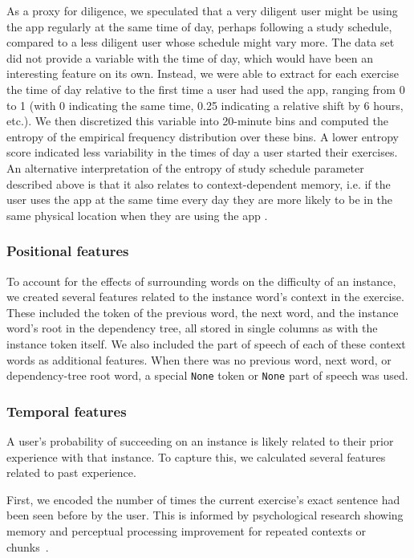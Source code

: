 \documentclass[11pt,a4paper]{article}
\begin{document}
As a proxy for diligence, we speculated that a very diligent user might be using the app regularly at the same time of day, perhaps following a study schedule, compared to a less diligent user whose schedule might vary more. The data set did not provide a variable with the time of day, which would have been an interesting feature on its own. Instead, we were able to extract for each exercise the time of day relative to the first time a user had used the app, ranging from 0 to 1 (with 0 indicating the same time, 0.25 indicating a relative shift by 6 hours, etc.).  We then discretized this variable into 20-minute bins and computed the entropy of the empirical frequency distribution over these bins. A lower entropy score indicated less variability in the times of day a user started their exercises. An alternative interpretation of the entropy of study schedule parameter described above is that it also relates to context-dependent memory, i.e. if the user uses the app at the same time every day they are more likely to be in the same physical location when they are using the app \cite{godden1975context}.

\subsubsection{Positional features}

To account for the effects of surrounding words on the difficulty of an
instance, we created several features related to the instance word's context in
the exercise. These included the token of the previous word, the next word, and
the instance word's root in the dependency tree, all stored in single columns as with
the instance token itself. We also included the part of speech of each of these
context words as additional features. When there was no previous word, next word, or dependency-tree
root word, a special {\tt None} token or {\tt None} part of speech was used.

\subsubsection{Temporal features}

A user's probability of succeeding on an instance is likely related to their
prior experience with that instance. To capture this, we calculated several
features related to past experience. 

First, we encoded the number of times the
current exercise's exact sentence had been seen before by the user. This is
informed by psychological research showing memory and perceptual processing
improvement for repeated contexts or chunks~\cite[e.g.,][]{Chun:1999gt}. 
\end{document}
